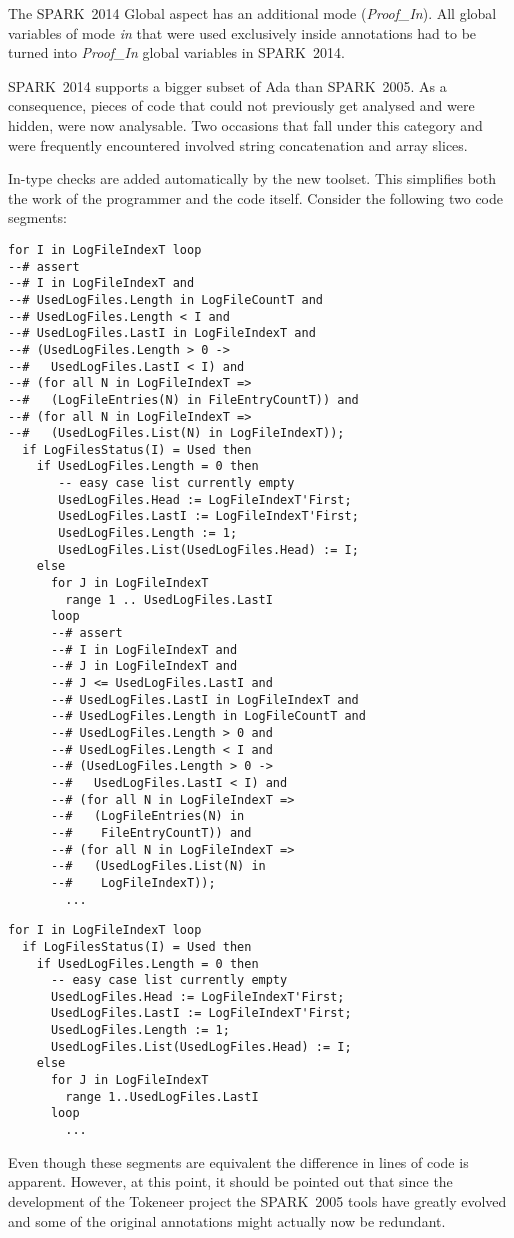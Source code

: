 \documentclass[10pt,a4paper,twocolumn]{article}
\newcommand{\oldspark}{SPARK~2005\xspace}
\newcommand{\newspark}{SPARK~2014\xspace}
\begin{document}
The \newspark Global aspect has an additional mode
(\emph{Proof\_In}). All global variables of mode \emph{in} that were
used exclusively inside annotations had to be turned into
\emph{Proof\_In} global variables in \newspark.

\newspark supports a bigger subset of Ada than \oldspark. As a
consequence, pieces of code that could not previously get analysed and
were hidden, were now analysable. Two occasions that fall under this
category and were frequently encountered involved string concatenation
and array slices.

In-type checks are added automatically by the new toolset. This
simplifies both the work of the programmer and the code
itself. Consider the following two code segments:

\begin{lstlisting}[caption=\oldspark]
for I in LogFileIndexT loop
--# assert
--# I in LogFileIndexT and
--# UsedLogFiles.Length in LogFileCountT and
--# UsedLogFiles.Length < I and
--# UsedLogFiles.LastI in LogFileIndexT and
--# (UsedLogFiles.Length > 0 ->
--#   UsedLogFiles.LastI < I) and
--# (for all N in LogFileIndexT =>
--#   (LogFileEntries(N) in FileEntryCountT)) and
--# (for all N in LogFileIndexT =>
--#   (UsedLogFiles.List(N) in LogFileIndexT));
  if LogFilesStatus(I) = Used then
    if UsedLogFiles.Length = 0 then
       -- easy case list currently empty
       UsedLogFiles.Head := LogFileIndexT'First;
       UsedLogFiles.LastI := LogFileIndexT'First;
       UsedLogFiles.Length := 1;
       UsedLogFiles.List(UsedLogFiles.Head) := I;
    else
      for J in LogFileIndexT
        range 1 .. UsedLogFiles.LastI
      loop
      --# assert
      --# I in LogFileIndexT and
      --# J in LogFileIndexT and
      --# J <= UsedLogFiles.LastI and
      --# UsedLogFiles.LastI in LogFileIndexT and
      --# UsedLogFiles.Length in LogFileCountT and
      --# UsedLogFiles.Length > 0 and
      --# UsedLogFiles.Length < I and
      --# (UsedLogFiles.Length > 0 ->
      --#   UsedLogFiles.LastI < I) and
      --# (for all N in LogFileIndexT =>
      --#   (LogFileEntries(N) in
      --#    FileEntryCountT)) and
      --# (for all N in LogFileIndexT =>
      --#   (UsedLogFiles.List(N) in
      --#    LogFileIndexT));
        ...
\end{lstlisting}

\begin{lstlisting}[caption=\newspark]
for I in LogFileIndexT loop
  if LogFilesStatus(I) = Used then
    if UsedLogFiles.Length = 0 then
      -- easy case list currently empty
      UsedLogFiles.Head := LogFileIndexT'First;
      UsedLogFiles.LastI := LogFileIndexT'First;
      UsedLogFiles.Length := 1;
      UsedLogFiles.List(UsedLogFiles.Head) := I;
    else
      for J in LogFileIndexT
        range 1..UsedLogFiles.LastI
      loop
        ...
\end{lstlisting}
Even though these segments are equivalent the difference in lines of
code is apparent. However, at this point, it should be pointed out
that since the development of the Tokeneer project the \oldspark tools
have greatly evolved and some of the original annotations might
actually now be redundant.
\end{document}
